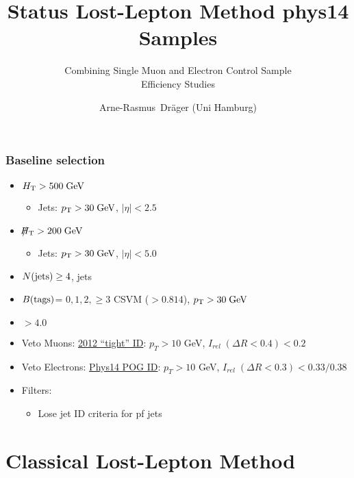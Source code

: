 \documentclass{beamer}
\title[RA2/b Meeting]{Status Lost-Lepton Method phys14 Samples}
\subtitle{Combining Single Muon and Electron Control Sample\\ Efficiency Studies}
\author[Arne-Rasmus~Dr\"ager]{
  Arne-Rasmus~Dr\"ager (Uni Hamburg)
}
\date[February 05, 2015]{February 05, 2015
  \vskip1cm
  \begin{center}
    \texttt{[image: Universitaet-Hamburg-Logo.jpg]}
    \hskip8cm
    \texttt{[image: CMSlogo.jpeg]}
  \end{center}
}
\begin{document}
\begin{frame}
  \titlepage
\end{frame}

\begin{frame}
\frametitle{Baseline selection}
\normalsize
\begin{itemize}
 \item $H_{\text{T}} >500 \;\text{Ge}\kern-0.06667em\text{V}$
 \begin{itemize}
       \item Jets: $p_{\text{T}}>30\;\text{Ge}\kern-0.06667em\text{V}$, $|\eta|<2.5$ 
      \end{itemize}
 \item $\slash\mkern-12mu{H}_{\text{T}} >200 \;\text{Ge}\kern-0.06667em\text{V}$
  \begin{itemize}
       \item Jets: $p_{\text{T}}>30\;\text{Ge}\kern-0.06667em\text{V}$, $|\eta|<5.0$
      \end{itemize}
 \item $N(\text{jets})\ge 4$, \HT jets
 \item $B(\text{tags})$= {$0,1,2,\geq3$} CSVM ($>0.814$), $p_{\text{T}}>30\;\text{Ge}\kern-0.06667em\text{V}$
\item  \dphin $> 4.0$
\item Veto Muons: \href{https://twiki.cern.ch/twiki/bin/view/CMSPublic/SWGuideMuonId\#Tight\_Muon}{2012 ``tight'' ID}: $p_T > 10$ GeV, $I_{rel}\; (\Delta R<0.4) < 0.2$    
    \item Veto Electrons: \href{https://twiki.cern.ch/twiki/bin/viewauth/CMS/CutBasedElectronIdentificationRun2\#CSA14\_selection\_conditions\_25ns}{Phys14 POG ID}:  $p_T > 10$ GeV, $I_{rel}\;
      (\Delta R<0.3) < 0.33 / 0.38$
      \item Filters:
      \begin{itemize}
       \item Lose jet ID criteria for pf jets
      \end{itemize}

% 
% 
\end{itemize}
\end{frame}

\section{Classical Lost-Lepton Method}
\begin{frame}

\end{frame}



\setcounter{framenumber}{19}
\end{document}
